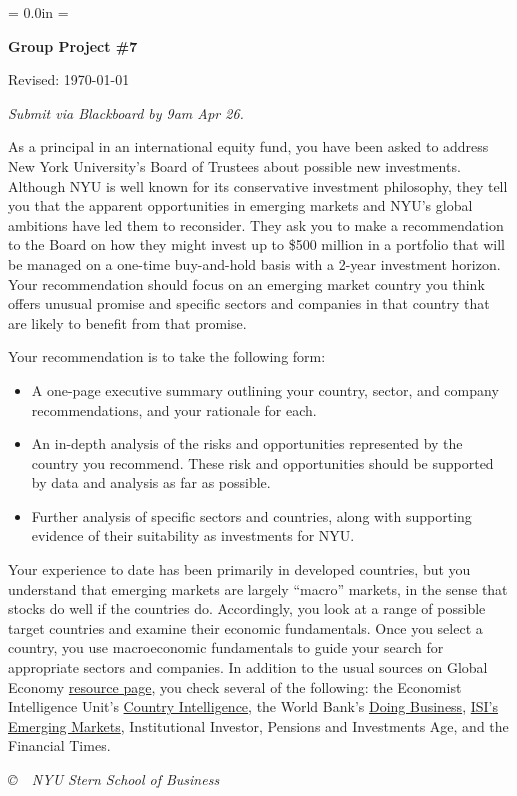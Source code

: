 \documentclass[letterpaper,12pt]{article}
\def\HeadName{Group Project \#7}
\begin{document}
\parindent = 0.0in
\parskip = \bigskipamount
\thispagestyle{empty}%
\Head

\centerline{\large \bf \HeadName}%
\centerline{Revised:  \today}

\medskip
{\it Submit via Blackboard by 9am Apr 26.}
\medskip

As a principal in an international equity fund, 
you have been asked to address New York University's Board of Trustees 
about possible new investments.
Although NYU is well known for its conservative investment philosophy, 
they tell you that the apparent opportunities in emerging markets 
and NYU's global ambitions have led them to reconsider.
They ask you to make a recommendation to the Board 
on how they might invest up to \$500 million in a portfolio 
that will be managed on a one-time buy-and-hold basis with a 2-year
investment horizon.  
Your recommendation should focus on 
an emerging market country you think offers unusual promise 
and specific sectors and companies in that country 
that are likely to benefit from that promise.  


Your recommendation is to take the following form:   
%
\begin{itemize}%

\item A one-page executive summary outlining your country, 
sector, and company recommendations, and your rationale for each.  

\item An in-depth analysis of the risks and opportunities 
represented by the country you recommend.  
These risk and opportunities should be supported by 
data and analysis as far as possible.  

\item Further analysis of specific sectors and countries, 
along with supporting evidence of their suitability
as investments for NYU.  

\end{itemize}


Your experience to date has been primarily in developed countries, 
but you understand that emerging markets are largely ``macro'' markets, 
in the sense that stocks do well if the countries do.  
Accordingly, you look at a range of possible target countries 
and examine their economic fundamentals.  
Once you select a country, you use macroeconomic fundamentals 
to guide your search for appropriate sectors and companies.   
In addition to the usual sources on Global Economy 
\href{http://www.stern.nyu.edu/eco/b012303/Backus/ge_resources_db.htm}
{resource page},
you check several of the following:  
the Economist Intelligence Unit's 
\href{http://db.eiu.com/index.asp?layout=AllTitles}{Country Intelligence},
the World Bank's 
\href{http://www.doingbusiness.org/}
{Doing Business},  
\href{http://site.securities.com/}
{ISI's Emerging Markets}, 
Institutional Investor, 
Pensions and Investments Age, 
and the Financial Times.  


\vfill \centerline{\it \copyright \ \number\year \  
NYU Stern School of Business}
\end{document}
